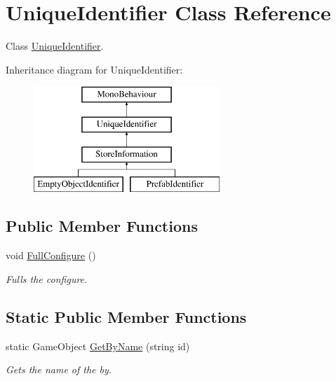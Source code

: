 \hypertarget{class_unique_identifier}{}\section{Unique\+Identifier Class Reference}
\label{class_unique_identifier}


Class \hyperlink{class_unique_identifier}{Unique\+Identifier}.  


Inheritance diagram for Unique\+Identifier\+:\begin{figure}[H]
\begin{center}
\leavevmode
\includegraphics[height=4.000000cm]{class_unique_identifier}
\end{center}
\end{figure}
\subsection*{Public Member Functions}
\begin{DoxyCompactItemize}
\item 
void \hyperlink{class_unique_identifier_a7508486be3a08da62e2cca4380a4831e}{Full\+Configure} ()
\begin{DoxyCompactList}\small\item\em Fulls the configure. \end{DoxyCompactList}\end{DoxyCompactItemize}
\subsection*{Static Public Member Functions}
\begin{DoxyCompactItemize}
\item 
static Game\+Object \hyperlink{class_unique_identifier_ac1d6be2c8446c7cfa55fa8ceee56d6c8}{Get\+By\+Name} (string id)
\begin{DoxyCompactList}\small\item\em Gets the name of the by. \end{DoxyCompactList}\end{DoxyCompactItemize}
